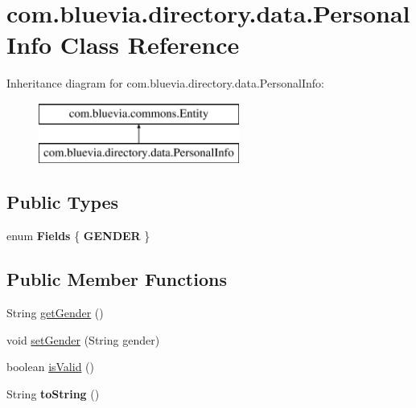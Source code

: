 \hypertarget{classcom_1_1bluevia_1_1directory_1_1data_1_1PersonalInfo}{
\section{com.bluevia.directory.data.PersonalInfo Class Reference}
\label{classcom_1_1bluevia_1_1directory_1_1data_1_1PersonalInfo}
}
Inheritance diagram for com.bluevia.directory.data.PersonalInfo:\begin{figure}[H]
\begin{center}
\leavevmode
\includegraphics[height=2.000000cm]{classcom_1_1bluevia_1_1directory_1_1data_1_1PersonalInfo}
\end{center}
\end{figure}
\subsection*{Public Types}
\begin{DoxyCompactItemize}
\item 
enum {\bfseries Fields} \{ {\bfseries GENDER}
 \}
\end{DoxyCompactItemize}
\subsection*{Public Member Functions}
\begin{DoxyCompactItemize}
\item 
String \hyperlink{classcom_1_1bluevia_1_1directory_1_1data_1_1PersonalInfo_aaa70d0671b95e805cfd2ccd16e6827df}{getGender} ()
\item 
void \hyperlink{classcom_1_1bluevia_1_1directory_1_1data_1_1PersonalInfo_a852fce1eac5406e1e322a1b11a1ed46d}{setGender} (String gender)
\item 
boolean \hyperlink{classcom_1_1bluevia_1_1directory_1_1data_1_1PersonalInfo_a2b6b524981dad9ac492a02fd7636e464}{isValid} ()
\item 
\hypertarget{classcom_1_1bluevia_1_1directory_1_1data_1_1PersonalInfo_a5461c4edb8a455a1200057fa41668c50}{
String {\bfseries toString} ()}
\label{classcom_1_1bluevia_1_1directory_1_1data_1_1PersonalInfo_a5461c4edb8a455a1200057fa41668c50}

\end{DoxyCompactItemize}


